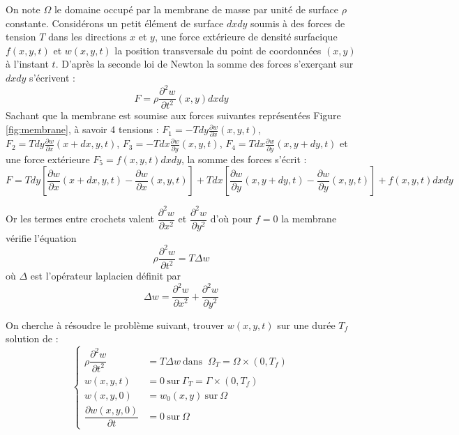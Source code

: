 \documentclass[a4,12pt]{article}
\begin{document}
        On note $\Omega$ le domaine occupé par la membrane de masse par unité de surface $\rho$ constante. Considérons un petit élément de surface $dxdy$ soumis à des forces de tension $T$  dans les directions $x$ et $y$, une force extérieure de densité surfacique $f(x,y,t)$ et $w(x,y,t)$ la position transversale du point de coordonnées $(x,y)$ à l'instant $t$. D'après la seconde loi de Newton la somme des forces s'exerçant sur $dxdy$ s'écrivent : 
        \[
        F=\rho  \frac{\partial^2 w}{\partial t^2}(x,y)dxdy
        \]
        Sachant que la membrane est soumise aux forces suivantes représentées Figure \ref{fig:membrane}, à savoir 4 tensions : $F_1=-Tdy\frac{\partial w}{\partial x}(x,y,t)$, $F_2=Tdy\frac{\partial w}{\partial x}(x+dx,y,t)$, $F_3=-Tdx\frac{\partial w}{\partial y}(x,y,t)$, $F_4=Tdx\frac{\partial w}{\partial y}(x,y+dy,t)$ et une force extérieure $F_5=f(x,y,t)dxdy$, la somme des forces s'écrit : 
        \[
        F=Tdy\left[\frac{\partial w}{\partial x}(x+dx,y,t)-\frac{\partial w}{\partial x}(x,y,t)\right]+Tdx\left[\frac{\partial w}{\partial y}(x,y+dy,t)-\frac{\partial w}{\partial y}(x,y,t)\right]+f(x,y,t)dxdy
        \]

        Or les termes entre crochets valent $\dfrac{\partial^2 w}{\partial x^2}$ et $\dfrac{\partial^2 w}{\partial y^2}$ d'où pour $f=0$ la membrane vérifie l'équation 
        \[
        \rho \dfrac{\partial^2 w}{\partial t^2}=T \Delta w
        \]
        où $\Delta$ est l'opérateur laplacien définit par 
        \[
        \Delta w=\dfrac{\partial^2 w}{\partial x^2}+\dfrac{\partial^2 w}{\partial y^2}
        \]


        On cherche à résoudre le problème suivant, trouver $w(x,y,t)$ sur une durée $T_f$ solution de :
        \begin{equation}
        \left\{
        \begin{array}{rl}
        \rho \dfrac{\partial^2 w}{\partial t^2} & =  T \Delta w ~\textrm{dans } ~ \Omega_T = \Omega \times (0,T_f)\\ 
        w(x,y,t)& =  0 ~\textrm{sur} ~ \Gamma_T=\Gamma \times (0,T_f)\\
                     w(x,y,0)& = w_0(x,y) ~ \textrm{sur} ~\Omega \\
                     \dfrac{\partial w(x,y,0)}{\partial t} & = 0 ~\textrm{sur} ~\Omega 
                     \end{array}
                     \right.
                     \label{eq:membranemodel}
                     \end{equation}
\end{document}
